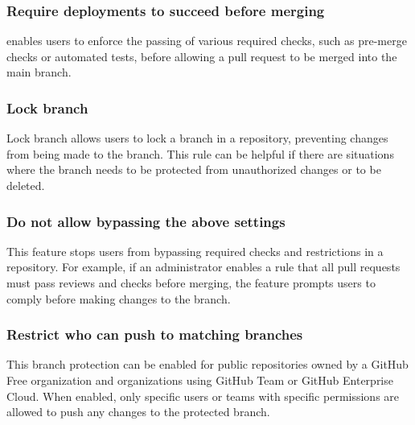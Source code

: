 \subsubsection{Require deployments to succeed before merging}
 enables users to enforce the passing of various required checks, such as pre-merge checks or automated tests, before allowing a pull request to be merged into the main branch.

\subsubsection{Lock branch}
Lock branch allows users to lock a branch in a repository, preventing changes from being made to the branch. This rule can be helpful if there are situations where the branch needs to be protected from unauthorized changes or to be deleted. 

\subsubsection{Do not allow bypassing the above settings}
This feature stops users from bypassing required checks and restrictions in a repository. For example, if an administrator enables a rule that all pull requests must pass reviews and checks before merging, the feature prompts users to comply before making changes to the branch.

\subsubsection{Restrict who can push to matching branches}
This branch protection can be enabled for public repositories owned by a GitHub Free organization and organizations using GitHub Team or GitHub Enterprise Cloud. When enabled, only specific users or teams with specific permissions are allowed to push any changes to the protected branch. 
\newpage

